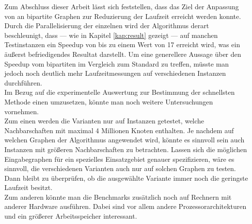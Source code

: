 



Zum Abschluss dieser Arbeit lässt sich feststellen, dass das Ziel 
der Anpassung von \gc{} an bipartite Graphen zur Reduzierung der Laufzeit erreicht werden konnte.
Durch die Parallelisierung der einzelnen  wird der Algorithmus derart beschleunigt, dass --- wie
in Kapitel \ref{kap:result} gezeigt --- auf manchen Testinstanzen ein
Speedup von bis zu einem Wert von 17 erreicht wird, was ein äußerst befriedigendes Resultat darstellt. 
Um eine generellere Aussage über den Speedup vom bipartiten \gc{} im Vergleich zum Standard  \gc{}
zu treffen, müsste man jedoch noch deutlich mehr Laufzeitmessungen auf verschiedenen Instanzen
durchführen.
\\

Im Bezug auf die experimentelle Auswertung zur Bestimmung der schnellsten Methode 
einen \ct{} umzusetzen, könnte man noch weitere Untersuchungen vornehmen.
\\

Zum einen werden die Varianten nur auf Instanzen getestet, welche Nachbarschaften mit 
maximal 4 Millionen Knoten enthalten. Je nachdem auf welchen Graphen der Algorithmus angewendet wird, 
könnte es sinnvoll sein auch Instanzen
mit größeren Nachbarschaften zu betrachten. Lassen sich die möglichen Eingabegraphen
für ein spezielles Einsatzgebiet genauer spezifizieren, wäre es sinnvoll, die verschiedenen
Varianten auch nur auf solchen Graphen zu testen. Dann bleibt zu überprüfen, ob die ausgewählte
Variante immer noch die geringste Laufzeit besitzt.
\\

Zum anderen könnte man die Benchmarks zusätzlich noch auf Rechnern mit anderer Hardware ausführen.
Dabei sind vor allem andere Prozessorarchitekturen und ein größerer Arbeitsspeicher interessant.
